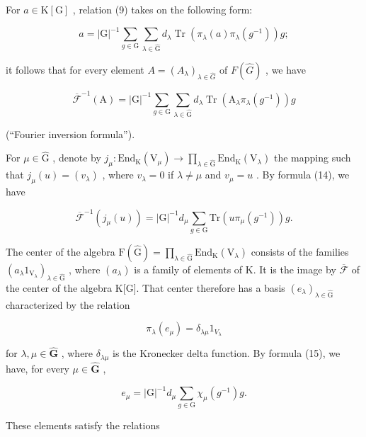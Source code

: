 For \(a \in \mathrm{K}[\mathrm{G}]\) , relation (9) takes on the following form:

\[
a = | \mathrm{G} | ^ {- 1} \sum_ {g \in \mathrm{G}} \sum_ {\lambda \in \widehat {\mathrm{G}}} d _ {\lambda} \left. \operatorname{Tr} (\pi_ {\lambda} (a) \pi_ {\lambda} (g ^ {- 1})) g; \right.\tag{13}
\]

it follows that for every element \(A = (A_{\lambda})_{\lambda \in \widehat{G}}\) of \(F(\widehat{G})\) , we have

\[
\overline {{\mathcal {F}}} ^ {- 1} (\mathrm{A}) = | \mathrm{G} | ^ {- 1} \sum_ {g \in \mathrm{G}} \sum_ {\lambda \in \widehat {\mathrm{G}}} d _ {\lambda} \operatorname{Tr} (\mathrm{A} _ {\lambda} \pi_ {\lambda} (g ^ {- 1})) g\tag{14}
\]

(``Fourier inversion formula'').

For \(\mu \in \widehat{\mathrm{G}}\) , denote by \(j_{\mu}:\mathrm{End}_{\mathrm{K}}(\mathrm{V}_{\mu})\longrightarrow \prod_{\lambda \in \widehat{\mathrm{G}}} \mathrm{End}_{\mathrm{K}}(\mathrm{V}_{\lambda})\) the mapping such that \(j_{\mu}(u) = (v_{\lambda})\) , where \(v_{\lambda} = 0\) if \(\lambda \neq \mu\) and \(v_{\mu} = u\) . By formula (14), we have

\[
\overline {{\mathcal {F}}} ^ {- 1} (j _ {\mu} (u)) = | \mathrm{G} | ^ {- 1} d _ {\mu} \sum_ {g \in \mathrm{G}} \mathrm{Tr} (u \pi_ {\mu} (g ^ {- 1})) g.\tag{15}
\]

The center of the algebra \(\mathrm{F}(\widehat{\mathrm{G}})=\prod_{\lambda\in\widehat{\mathrm{G}}} \mathrm{End}_{\mathrm{K}}(\mathrm{V}_{\lambda})\) consists of the families \((a_{\lambda}1_{\mathrm{V}_{\lambda}})_{\lambda\in\widehat{\mathrm{G}}}\) , where \((a_{\lambda})\) is a family of elements of K. It is the image by \(\overline{{\mathcal{F}}}\) of the center of the algebra K{[}G{]}. That center therefore has a basis \((e_{\lambda})_{\lambda\in\widehat{\mathrm{G}}}\) characterized by the relation

\[
\pi_ {\lambda} (e _ {\mu}) = \delta_ {\lambda \mu} 1 _ {V _ {\lambda}}\tag{16}
\]

for \(\lambda, \mu \in \widehat{\mathbf{G}}\) , where \(\delta_{\lambda \mu}\) is the Kronecker delta function. By formula (15), we have, for every \(\mu \in \widehat{\mathbf{G}}\) ,

\[
e _ {\mu} = | \mathrm{G} | ^ {- 1} d _ {\mu} \sum_ {g \in \mathrm{G}} \chi_ {\mu} (g ^ {- 1}) g.\tag{17}
\]

These elements satisfy the relations

